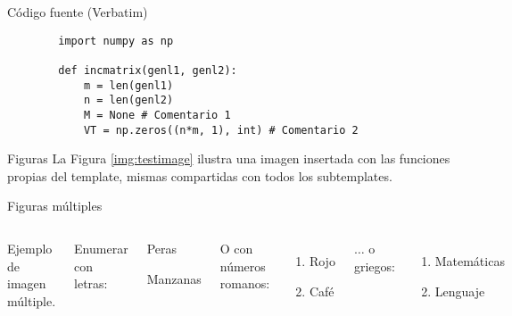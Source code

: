 
\begin{frame}[fragile]{Código fuente (Verbatim)}
	\begin{example}
		\begin{verbatim}
		import numpy as np
		
		def incmatrix(genl1, genl2):
			m = len(genl1)
			n = len(genl2)
			M = None # Comentario 1
			VT = np.zeros((n*m, 1), int) # Comentario 2
		\end{verbatim}
	\end{example}
\end{frame}


\begin{frame}{Figuras}
	La Figura \ref{img:testimage} ilustra una imagen insertada con las funciones propias del template, mismas compartidas con todos los subtemplates.
	
\end{frame}


\begin{frame}{Figuras múltiples}
	\begin{columns}[c]
		\begin{images}{Ejemplo de imagen múltiple.}
			\imagesnewline
		\end{images}
		
		
		Enumerar con letras:
		
		\begin{enumeratebf}[label=\alph*) ] %
			\item Peras
			\item Manzanas
		\end{enumeratebf}
		
		O con números romanos:
		
		\begin{enumerate}[label=\roman*) ]
			\item Rojo
			\item Café
		\end{enumerate}
		
		$\ldots$ o griegos:
		
		\begin{enumerate}[label=\greek*) ]
			\item Matemáticas
			\item Lenguaje
		\end{enumerate}
	\end{columns}
\end{frame}

